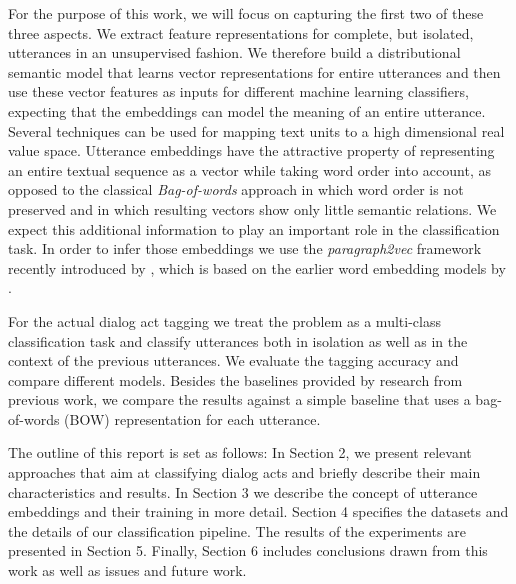 For the purpose of this work, we will focus on capturing the first two of these three aspects. We extract feature representations for complete, but isolated, utterances in an unsupervised fashion.
We therefore build a distributional semantic model that learns vector representations for entire utterances and then use these vector features as inputs for different machine learning classifiers, expecting that the embeddings can model the meaning of an entire utterance.
Several techniques can be used for mapping text units to a high dimensional real value space.
Utterance embeddings have the attractive property of representing an entire textual sequence as a vector while taking word order into account, as opposed to the classical \emph{Bag-of-words} approach in which word order is not preserved and in which resulting vectors show only little semantic relations.
We expect this additional information to play an important role in the classification task. In order to infer those embeddings we use the \emph{paragraph2vec} framework recently introduced by , which is based on the earlier word embedding models by .

For the actual dialog act tagging we treat the problem as a multi-class classification task and classify utterances both in isolation as well as in the context of the previous utterances.
We evaluate the tagging accuracy and compare different models.
Besides the baselines provided by research from previous work, we compare the results against a simple baseline that uses a bag-of-words (BOW) representation for each utterance. 

The outline of this report is set as follows: In Section 2, we present relevant approaches that aim at classifying dialog acts and briefly describe their main characteristics and results. In Section 3 we describe the concept of utterance embeddings and their training in more detail. Section 4 specifies the datasets and the details of our classification pipeline. The results of the experiments are presented in Section 5. Finally, Section 6 includes conclusions drawn from this work as well as issues and future work. 

